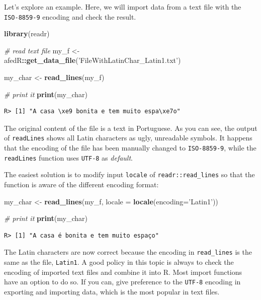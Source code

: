 \documentclass[
  12pt,
]{book}
\newenvironment{Shaded}{\begin{snugshade}}{\end{snugshade}}
\newcommand{\CommentTok}[1]{\textcolor[rgb]{0.37,0.37,0.37}{\textit{#1}}}
\newcommand{\DataTypeTok}[1]{\textcolor[rgb]{0.27,0.27,0.27}{#1}}
\newcommand{\KeywordTok}[1]{\textcolor[rgb]{0.27,0.27,0.27}{\textbf{#1}}}
\newcommand{\NormalTok}[1]{#1}
\newcommand{\OperatorTok}[1]{\textcolor[rgb]{0.43,0.43,0.43}{\textbf{#1}}}
\newcommand{\StringTok}[1]{\textcolor[rgb]{0.5,0.5,0.5}{#1}}
\begin{document}
Let's explore an example. Here, we will import data from a text file with the \texttt{\textquotesingle{}ISO-8859-9\textquotesingle{}} encoding and check the result.

\begin{Shaded}
\begin{Highlighting}[]
\KeywordTok{library}\NormalTok{(readr)}

\CommentTok{# read text file}
\NormalTok{my_f <-}\StringTok{ }\NormalTok{afedR}\OperatorTok{::}\KeywordTok{get_data_file}\NormalTok{(}\StringTok{'FileWithLatinChar_Latin1.txt'}\NormalTok{)}

\NormalTok{my_char <-}\StringTok{ }\KeywordTok{read_lines}\NormalTok{(my_f)}

\CommentTok{# print it}
\KeywordTok{print}\NormalTok{(my_char)}
\end{Highlighting}
\end{Shaded}

\begin{verbatim}
R> [1] "A casa \xe9 bonita e tem muito espa\xe7o"
\end{verbatim}

The original content of the file is a text in Portuguese. As you can see, the output of \texttt{readLines} shows all Latin characters as ugly, unreadable symbols. It happens that the encoding of the file has been manually changed to \texttt{\textquotesingle{}ISO-8859-9\textquotesingle{}}, while the \texttt{readLines} function uses \texttt{\textquotesingle{}UTF-8\textquotesingle{}} as \emph{default}.

The easiest solution is to modify input \texttt{locale} of \texttt{readr::read\_lines} so that the function is aware of the different encoding format:

\begin{Shaded}
\begin{Highlighting}[]
\NormalTok{my_char <-}\StringTok{ }\KeywordTok{read_lines}\NormalTok{(my_f, }
                      \DataTypeTok{locale =} \KeywordTok{locale}\NormalTok{(}\DataTypeTok{encoding=}\StringTok{'Latin1'}\NormalTok{))}

\CommentTok{# print it}
\KeywordTok{print}\NormalTok{(my_char)}
\end{Highlighting}
\end{Shaded}

\begin{verbatim}
R> [1] "A casa é bonita e tem muito espaço"
\end{verbatim}

The Latin characters are now correct because the encoding in \texttt{read\_lines} is the same as the file, \texttt{\textquotesingle{}Latin1\textquotesingle{}}. A good policy in this topic is always to check the encoding of imported text files and combine it into R. Most import functions have an option to do so. If you can, give preference to the \texttt{\textquotesingle{}UTF-8\textquotesingle{}} encoding in exporting and importing data, which is the most popular in text files.
\end{document}

